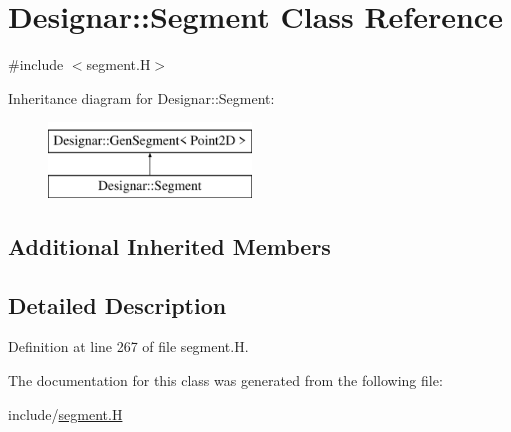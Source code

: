 \hypertarget{class_designar_1_1_segment}{}\section{Designar\+:\+:Segment Class Reference}
\label{class_designar_1_1_segment}


{\ttfamily \#include $<$segment.\+H$>$}

Inheritance diagram for Designar\+:\+:Segment\+:\begin{figure}[H]
\begin{center}
\leavevmode
\includegraphics[height=2.000000cm]{class_designar_1_1_segment}
\end{center}
\end{figure}
\subsection*{Additional Inherited Members}


\subsection{Detailed Description}


Definition at line 267 of file segment.\+H.



The documentation for this class was generated from the following file\+:\begin{DoxyCompactItemize}
\item 
include/\hyperlink{segment_8_h}{segment.\+H}\end{DoxyCompactItemize}
